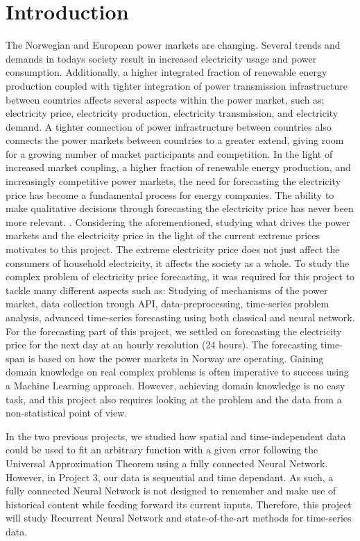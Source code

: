 \documentclass
[twocolumn,
secnumarabic,
nobibnotes,
aps,
prl,
reprint,
groupedaddress,
amsmath,
amssymb,
]{revtex4-2}
\begin{document}
\section{Introduction}
The Norwegian and European power markets are changing. Several trends and demands in todays society result in increased electricity usage and power consumption. Additionally, a higher integrated fraction of renewable energy production coupled with tighter integration of power transmission infrastructure between countries affects several aspects within the power market, such as; electricity price, electricity production, electricity transmission, and electricity demand. A tighter connection of power infrastructure between countries also connects the power markets between countries to a greater extend, giving room for a growing number of market participants and competition. In the light of increased market coupling, a higher fraction of renewable energy production, and increasingly competitive power markets, the need for forecasting the electricity price has become a fundamental process for energy companies. The ability to make qualitative decisions through forecasting the electricity price has never been more relevant. \cite{nowotarski_recent_2018}. Considering the aforementioned, studying what drives the power markets and the electricity price in the light of the current extreme prices motivates to this project. The extreme electricity price does not just affect the consumers of household electricity, it affects the society as a whole. To study the complex problem of electricity price forecasting, it was required for this project to tackle many different aspects such as: Studying of mechanisms of the power market, data collection trough API, data-preprocessing, time-series problem analysis, advanced time-series forecasting using both classical and neural network. For the forecasting part of this project, we settled on forecasting the electricity price for the next day at an hourly resolution (24 hours). The forecasting time-span is based on how the power markets in Norway are operating. Gaining domain knowledge on real complex problems is often imperative to success using a Machine Learning approach. However, achieving domain knowledge is no easy task, and this project also requires looking at the problem and the data from a non-statistical point of view.

In the two previous projects, we studied how spatial and time-independent data could be used to fit an arbitrary function with a given error following the Universal Approximation Theorem \cite{Nielsen2015} using a fully connected Neural Network. However, in Project 3, our data is sequential and time dependant. As such, a fully connected Neural Network is not designed to remember and make use of historical content while feeding forward its current inputs. Therefore, this project will study Recurrent Neural Network and state-of-the-art methods for time-series data.
\end{document}
